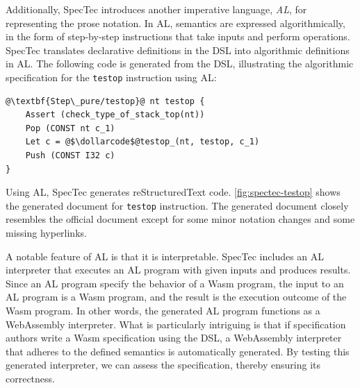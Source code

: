 Additionally, SpecTec introduces another imperative language, \textit{AL}, for
representing the prose notation.
In AL, semantics are expressed algorithmically, in the form of step-by-step
instructions that take inputs and perform operations.
SpecTec translates declarative definitions in the DSL into algorithmic
definitions in AL.
The following code is generated from the DSL, illustrating the algorithmic
specification for the \texttt{testop} instruction using AL:
\begin{lstlisting}[style=al]
@\textbf{Step\_pure/testop}@ nt testop {
    Assert (check_type_of_stack_top(nt))
    Pop (CONST nt c_1)
    Let c = @$\dollarcode$@testop_(nt, testop, c_1)
    Push (CONST I32 c)
}
\end{lstlisting}
Using AL, SpecTec generates reStructuredText code.
\cref{fig:spectec-testop} shows the generated document for \texttt{testop}
instruction.
The generated document closely resembles the official document except for some
minor notation changes and some missing hyperlinks.


A notable feature of AL is that it is interpretable.
SpecTec includes an AL interpreter that executes an AL program with given inputs
and produces results.
Since an AL program specify the behavior of a Wasm program, the input to an AL
program is a Wasm program, and the result is the execution outcome of the Wasm
program.
In other words, the generated AL program functions as a WebAssembly interpreter.
What is particularly intriguing is that if specification authors write a Wasm
specification using the DSL, a WebAssembly interpreter that adheres to the
defined semantics is automatically generated.
By testing this generated interpreter, we can assess the specification,
thereby ensuring its correctness.
